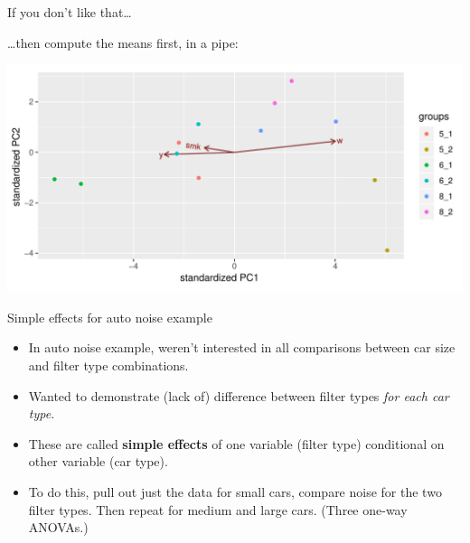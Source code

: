 \begin{frame}[fragile]{If you don't like that\ldots}
  
  \ldots then compute the means first, in a pipe:

  \begin{small}
\begin{knitrout}
\color{fgcolor}
\includegraphics[width=\maxwidth]{figure/unnamed-chunk-24-1} 

\end{knitrout}
    
  \end{small}
  
\end{frame}


\begin{frame}[fragile]{Simple effects for auto noise example}
  \begin{itemize}
  \item In auto noise example, weren't interested in all comparisons
    between car size and filter type combinations.
  \item Wanted to demonstrate (lack of) difference between filter types
    \emph{for each car type}. 

  \item These are called \textbf{simple effects} of one variable
    (filter type)
    conditional on other variable (car type).

  \item To do this, pull out just the data for small cars, compare
    noise for the two filter types. Then repeat for medium and large
    cars. (Three one-way ANOVAs.)

  \end{itemize}
\end{frame}

